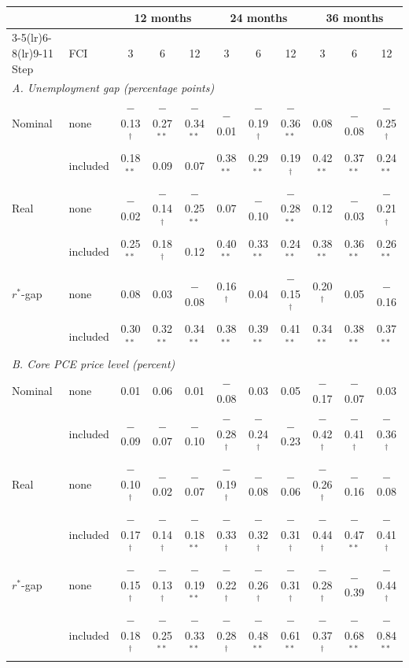 \begin{tabular}{llccccccccc}
\toprule
 & & \multicolumn{3}{c}{12 months} & \multicolumn{3}{c}{24 months} & \multicolumn{3}{c}{36 months}\\
\cmidrule(lr){3-5}\cmidrule(lr){6-8}\cmidrule(lr){9-11}
Step & FCI & 3 & 6 & 12 & 3 & 6 & 12 & 3 & 6 & 12 \\
\midrule
\multicolumn{11}{l}{\textit{A. Unemployment gap (percentage points)}}\\
Nominal & none & $-$0.13$^{\dagger}$ & $-$0.27$^{**}$ & $-$0.34$^{**}$ & $-$0.01 & $-$0.19$^{\dagger}$ & $-$0.36$^{**}$ & 0.08 & $-$0.08 & $-$0.25$^{\dagger}$ \\
 & included & 0.18$^{**}$ & 0.09 & 0.07 & 0.38$^{**}$ & 0.29$^{**}$ & 0.19$^{\dagger}$ & 0.42$^{**}$ & 0.37$^{**}$ & 0.24$^{**}$ \\
Real & none & $-$0.02 & $-$0.14$^{\dagger}$ & $-$0.25$^{**}$ & 0.07 & $-$0.10 & $-$0.28$^{**}$ & 0.12 & $-$0.03 & $-$0.21$^{\dagger}$ \\
 & included & 0.25$^{**}$ & 0.18$^{\dagger}$ & 0.12 & 0.40$^{**}$ & 0.33$^{**}$ & 0.24$^{**}$ & 0.38$^{**}$ & 0.36$^{**}$ & 0.26$^{**}$ \\
$r^*$-gap & none & 0.08 & 0.03 & $-$0.08 & 0.16$^{\dagger}$ & 0.04 & $-$0.15$^{\dagger}$ & 0.20$^{\dagger}$ & 0.05 & $-$0.16 \\
 & included & 0.30$^{**}$ & 0.32$^{**}$ & 0.34$^{**}$ & 0.38$^{**}$ & 0.39$^{**}$ & 0.41$^{**}$ & 0.34$^{**}$ & 0.38$^{**}$ & 0.37$^{**}$ \\
\midrule
\multicolumn{11}{l}{\textit{B. Core PCE price level (percent)}}\\
Nominal & none & 0.01 & 0.06 & 0.01 & $-$0.08 & 0.03 & 0.05 & $-$0.17 & $-$0.07 & 0.03 \\
 & included & $-$0.09 & $-$0.07 & $-$0.10 & $-$0.28$^{\dagger}$ & $-$0.24$^{\dagger}$ & $-$0.23 & $-$0.42$^{\dagger}$ & $-$0.41$^{\dagger}$ & $-$0.36$^{\dagger}$ \\
Real & none & $-$0.10$^{\dagger}$ & $-$0.02 & $-$0.07 & $-$0.19$^{\dagger}$ & $-$0.08 & $-$0.06 & $-$0.26$^{\dagger}$ & $-$0.16 & $-$0.08 \\
 & included & $-$0.17$^{\dagger}$ & $-$0.14$^{\dagger}$ & $-$0.18$^{**}$ & $-$0.33$^{\dagger}$ & $-$0.32$^{\dagger}$ & $-$0.31$^{\dagger}$ & $-$0.44$^{\dagger}$ & $-$0.47$^{**}$ & $-$0.41$^{\dagger}$ \\
$r^*$-gap & none & $-$0.15$^{\dagger}$ & $-$0.13$^{\dagger}$ & $-$0.19$^{**}$ & $-$0.22$^{\dagger}$ & $-$0.26$^{\dagger}$ & $-$0.31$^{\dagger}$ & $-$0.28$^{\dagger}$ & $-$0.39 & $-$0.44$^{\dagger}$ \\
 & included & $-$0.18$^{\dagger}$ & $-$0.25$^{**}$ & $-$0.33$^{**}$ & $-$0.28$^{\dagger}$ & $-$0.48$^{**}$ & $-$0.61$^{**}$ & $-$0.37$^{\dagger}$ & $-$0.68$^{**}$ & $-$0.84$^{**}$ \\
\bottomrule
\end{tabular}
